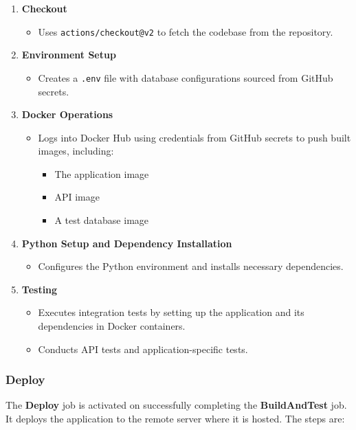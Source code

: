 \documentclass[12pt, a4paper, oneside]{book}
\begin{document}
\begin{enumerate}
    \item \textbf{Checkout} 
    \begin{itemize}
        \item Uses \texttt{actions/checkout@v2} to fetch the codebase from the repository.
    \end{itemize}
    
    \item \textbf{Environment Setup} 
    \begin{itemize}
        \item Creates a \texttt{.env} file with database configurations sourced from GitHub secrets.
    \end{itemize}
    
    \item \textbf{Docker Operations}
    \begin{itemize}
        \item Logs into Docker Hub using credentials from GitHub secrets to push built images, including:
        \begin{itemize}
            \item The application image
            \item API image
            \item A test database image
        \end{itemize}
    \end{itemize}
    
    \item \textbf{Python Setup and Dependency Installation}
    \begin{itemize}
        \item Configures the Python environment and installs necessary dependencies.
    \end{itemize}
    
    \item \textbf{Testing}
    \begin{itemize}
        \item Executes integration tests by setting up the application and its dependencies in Docker containers.
        \item Conducts API tests and application-specific tests.
    \end{itemize}
\end{enumerate}

\subsubsection{Deploy}
The \textbf{Deploy} job is activated on successfully completing the \textbf{BuildAndTest} job.
It deploys the application to the remote server where it is hosted.
The steps are:
\end{document}
